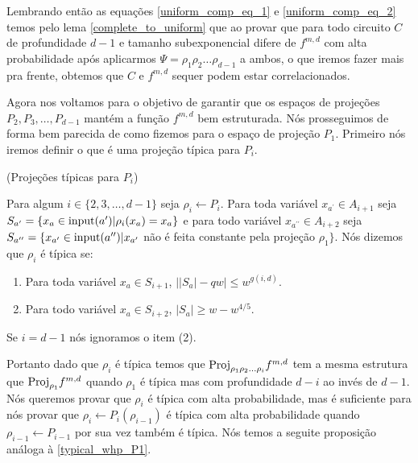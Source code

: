 Lembrando então as equações \ref{uniform_comp_eq_1} e \ref{uniform_comp_eq_2} temos pelo lema \ref{complete_to_uniform} que ao provar que para todo circuito $C$ de profundidade $d - 1$ e tamanho subexponencial difere de $f^{m, d}$ com alta probabilidade após aplicarmos $\Psi = \rho_{1}\rho_{2}\dots\rho_{d - 1}$ a ambos, o que iremos fazer mais pra frente, obtemos que $C$ e $f^{m, d}$ sequer podem estar correlacionados.

Agora nos voltamos para o objetivo de garantir que os espaços de projeções $P_{2}, P_{3}, \dots, P_{d - 1}$ mantém a função $f^{m, d}$ bem estruturada. Nós prosseguimos de forma bem parecida de como fizemos para o espaço de projeção $P_{1}$. Primeiro nós iremos definir o que é uma projeção típica para $P_{i}$.

\begin{defi} (Projeções típicas para $P_{i}$) \label{typical_proj_Pi}

Para algum $i \in \{2, 3, \dots, d - 1\}$ seja $\rho_{i} \leftarrow P_{i}$. Para toda variável $x_{a^{\prime}} \in A_{i + 1}$ seja $S_{a^{\prime}} = \{x_{a} \in \text{input}(a^{\prime}) \lvert \rho_{i}(x_{a}) = x_{a}\}$ e para todo variável $x_{a^{\prime \prime}} \in A_{i + 2}$ seja $S_{a^{\prime \prime}} = \{x_{a^{\prime}} \in \text{input}(a^{\prime \prime}) \lvert x_{a^{\prime}} $ não é feita constante pela projeção $\rho_{1}\}$. Nós dizemos que $\rho_{i}$ é típica se:

\begin{enumerate}

	\item Para toda variável $x_{a} \in S_{i + 1}$, $\big\lvert \lvert S_{a} \rvert - qw \big\rvert \leq w^{g(i, d)}$.
	
	\item Para todo variável $x_{a} \in S_{i + 2}$, $\lvert S_{a} \rvert \geq w - w^{4/5}$.

\end{enumerate}


Se $i = d - 1$ nós ignoramos o item (2).

\end{defi}

Portanto dado que $\rho_{i}$ é típica temos que $\text{Proj}_{\rho_{1}\rho_{2}\dots\rho_{i}}f^{m, d}$ tem a mesma estrutura que $\text{Proj}_{\rho_{1}}f^{m, d}$ quando $\rho_{1}$ é típica mas com profundidade $d - i$ ao invés de $d - 1$. Nós queremos provar que $\rho_{i}$ é típica com alta probabilidade, mas é suficiente para nós provar que $\rho_{i} \leftarrow P_{i}(\rho_{i - 1})$ é típica com alta probabilidade quando $\rho_{i - 1} \leftarrow P_{i - 1}$ por sua vez também é típica. Nós temos a seguite proposição análoga à \ref{typical_whp_P1}.

